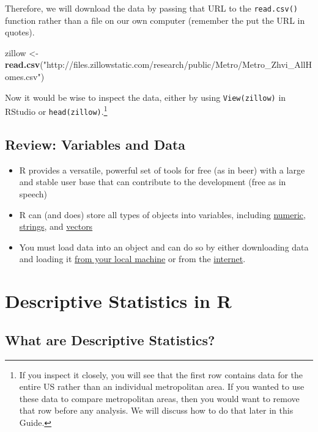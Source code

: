 \documentclass[]{article}
\newenvironment{Shaded}{\begin{snugshade}}{\end{snugshade}}
\newcommand{\KeywordTok}[1]{\textcolor[rgb]{0.13,0.29,0.53}{\textbf{{#1}}}}
\newcommand{\StringTok}[1]{\textcolor[rgb]{0.31,0.60,0.02}{{#1}}}
\newcommand{\NormalTok}[1]{{#1}}
\providecommand{\tightlist}{%
  \setlength{\itemsep}{0pt}\setlength{\parskip}{0pt}}
\let\rmarkdownfootnote\footnote%
\def\footnote{\protect\rmarkdownfootnote}
\begin{document}
Therefore, we will download the data by passing that URL to the
\texttt{read.csv()} function rather than a file on our own computer
(remember the put the URL in quotes).

\begin{Shaded}
\begin{Highlighting}[]
\NormalTok{zillow <-}\StringTok{ }\KeywordTok{read.csv}\NormalTok{(}\StringTok{"http://files.zillowstatic.com/research/public/Metro/Metro_Zhvi_AllHomes.csv"}\NormalTok{)}
\end{Highlighting}
\end{Shaded}

Now it would be wise to inspect the data, either by using
\texttt{View(zillow)} in RStudio or \texttt{head(zillow)}.\footnote{If
  you inspect it closely, you will see that the first row contains data
  for the entire US rather than an individual metropolitan area. If you
  wanted to use these data to compare metropolitan areas, then you would
  want to remove that row before any analysis. We will discuss how to do
  that later in this Guide.}

\subsection{Review: Variables and Data}\label{review-variables-and-data}

\begin{itemize}
\tightlist
\item
  R provides a versatile, powerful set of tools for free (as in beer)
  with a large and stable user base that can contribute to the
  development (free as in speech)
\item
  R can (and does) store all types of objects into variables, including
  \protect\hyperlink{vars_numeric}{numeric},
  \protect\hyperlink{vars_string}{strings}, and
  \protect\hyperlink{vars_vector}{vectors}
\item
  You must load data into an object and can do so by either downloading
  data and loading it \protect\hyperlink{data_local}{from your local
  machine} or from the \protect\hyperlink{data_internet}{internet}.
\end{itemize}

\section{Descriptive Statistics in R}\label{descriptive-statistics-in-r}

\subsection{What are Descriptive
Statistics?}\label{what-are-descriptive-statistics}
\end{document}
